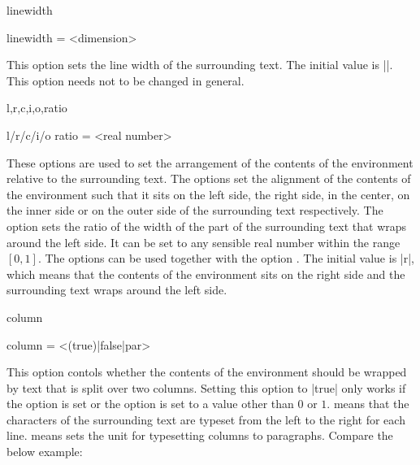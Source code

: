 \documentclass{ctxdoc}
\begin{document}
\begin{documentation}
 \begin{function}{linewidth}
   \begin{syntax}
     linewidth = <dimension>
   \end{syntax}
   This option sets the line width of the surrounding text. The initial value is |\linewidth|. This option needs not to be changed in general.
 \end{function}

 \begin{function}{l,r,c,i,o,ratio}
   \begin{syntax}
     l/r/c/i/o
     ratio = <real number>
   \end{syntax}
   These options are used to set the arrangement of the contents of the  environment relative to the surrounding text.
   The options  set the alignment of the contents of the  environment such that it sits on the left side, the right side, in the center, on the inner side or on the outer side of the surrounding text respectively.
   The option  sets the ratio of the width of the part of the surrounding text that wraps around the left side. It can be set to any sensible real number within the range $[0,1]$.
   The options  can be used together with the option .
   The initial value is |r|, which means that the contents of the  environment sits on the right side and the surrounding text wraps around the left side.
 \end{function}

 \begin{function}{column}
   \begin{syntax}
     column = <(true)|false|par>
   \end{syntax}
   This option contols whether the contents of the  environment should be wrapped by text that is split over two columns. Setting this option to |true| only works if the option  is set or the option  is set to a value other than $0$ or $1$.
    means that the characters of the surrounding text are typeset from the left to the right for each line.
    means sets the unit for typesetting columns to paragraphs. Compare the below example:
   \begin{SideBySideExample}[xrightmargin=\dimeval{22em+5mm}]
     \begin{wrapstuff}[c,1]
     \end{wrapstuff}
     \EXAMPLE
     \begin{wrapstuff}[c,1,column=par]
     \end{wrapstuff}
     \EXAMPLE
     \begin{wrapstuff}[c,0,column=false]
     \end{wrapstuff}
     \EXAMPLE
   \end{SideBySideExample}
 \end{function}


\end{documentation}
\end{document}

